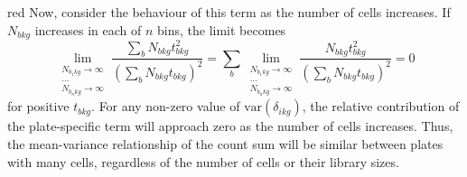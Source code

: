 \documentclass{article}
\begin{document}
\begin{color}{red}
Now, consider the behaviour of this term as the number of cells increases.
If $N_{bkg}$ increases in each of $n$ bins, the limit becomes
\[
    \lim_{\substack{N_{b_1kg} \to \infty \\ \dots \\ N_{b_nkg} \to \infty}} \frac{\sum_{b} N_{bkg} t_{bkg}^2}{ (\sum_{b} N_{bkg} t_{bkg})^2} 
    = \sum_{b} \lim_{\substack{N_{b_1kg} \to \infty \\ \dots \\ N_{b_nkg} \to \infty}} \frac{N_{bkg} t_{bkg}^2}{ (\sum_{b} N_{bkg} t_{bkg})^2} 
= 0
\]
for positive $t_{bkg}$.
For any non-zero value of $\mbox{var}(\delta_{ikg})$, the relative contribution of the plate-specific term will approach zero as the number of cells increases.
Thus, the mean-variance relationship of the count sum will be similar between plates with many cells, regardless of the number of cells or their library sizes.
\end{color}



\end{document}
